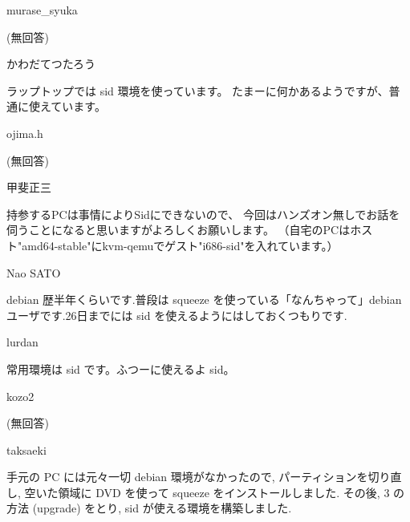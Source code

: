 \documentclass[mingoth,a4paper]{jsarticle}
\begin{document}
\begin{prework}{ murase\_syuka }

(無回答)

\end{prework}

\begin{prework}{ かわだてつたろう }

ラップトップでは sid 環境を使っています。
たまーに何かあるようですが、普通に使えています。
\end{prework}

\begin{prework}{ ojima.h }

(無回答)

\end{prework}

\begin{prework}{ 甲斐正三 }

持参するPCは事情によりSidにできないので、
今回はハンズオン無しでお話を伺うことになると思いますがよろしくお願いします。
（自宅のPCはホスト"amd64-stable"にkvm-qemuでゲスト"i686-sid"を入れています。）

\end{prework}

\begin{prework}{ Nao SATO }

debian 歴半年くらいです.普段は squeeze を使っている「なんちゃって」debian ユーザです.26日までには sid を使えるようにはしておくつもりです.

\end{prework}

\begin{prework}{ lurdan }

常用環境は sid です。ふつーに使えるよ sid。

\end{prework}

\begin{prework}{ kozo2 }

(無回答)

\end{prework}

\begin{prework}{ taksaeki }

手元の PC には元々一切 debian 環境がなかったので, パーティションを切り直し, 空いた領域に DVD を使って squeeze をインストールしました.
その後, 3 の方法 (upgrade) をとり, sid が使える環境を構築しました.

\end{prework}
\end{document}
